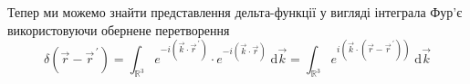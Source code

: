 Тепер ми можемо знайти представлення дельта-функції у вигляді інтеграла Фур'є використовуючи обернене перетворення
\begin{equation}
    \delta(\vec{r} - \vec{r}^{\,\prime}) = \int_{\mathbb{R}^3} e^{-i(\vec{k}\cdot\vec{r}^{\,\prime})} \cdot e^{-i(\vec{k}\cdot\vec{r})} \; \mathrm{d}\vec{k} = \int_{\mathbb{R}^3} e^{i(\vec{k}\cdot(\vec{r} - \vec{r}^{\,\prime}))} \; \mathrm{d}\vec{k}
\end{equation}

%